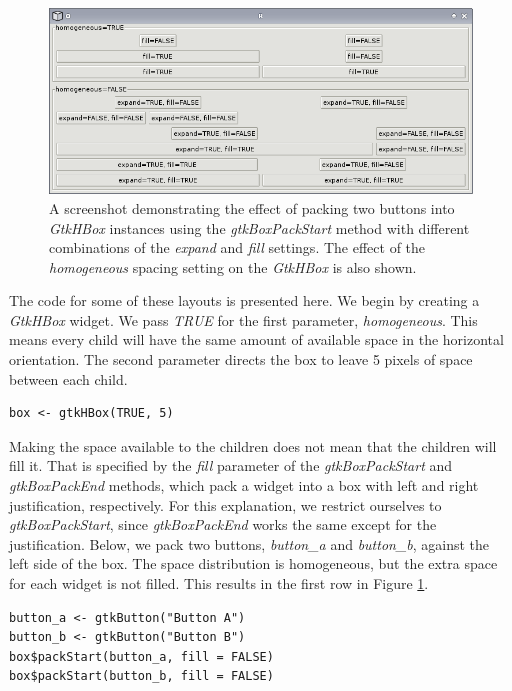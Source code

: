 \documentclass[article]{jss}
\begin{document}
\begin{figure}
\begin{center}
\includegraphics{packing.png}
\caption{\label{fig:packing}A screenshot demonstrating the effect of packing two
buttons into \emph{GtkHBox} instances using the \emph{gtkBoxPackStart} method 
with different combinations of the \emph{expand} and \emph{fill} settings. 
The effect of the \emph{homogeneous} spacing setting on the \emph{GtkHBox} is 
also shown.}
\end{center}
\end{figure}

The code for some of these layouts is presented here.
We begin by creating a \emph{GtkHBox} widget. We pass \emph{TRUE} for the
first parameter, \emph{homogeneous}. This means every child will have the
same amount of available space in the horizontal orientation. The second 
parameter directs the box to leave 5 pixels of space between each child. 
\begin{verbatim}
box <- gtkHBox(TRUE, 5)
\end{verbatim}
Making the space available to the children does not mean that the children 
will fill it. That is specified by the \emph{fill} parameter of the 
\emph{gtkBoxPackStart} and \emph{gtkBoxPackEnd} methods, which pack a widget 
into a box with left and right justification, respectively. For this explanation,
we restrict ourselves to \emph{gtkBoxPackStart}, since \emph{gtkBoxPackEnd}
works the same except for the justification. Below, we pack two buttons, 
\emph{button\_a} and \emph{button\_b}, against
the left side of the box. The space distribution is homogeneous, but the
extra space for each widget is not filled. This results in the first row in 
Figure \ref{fig:packing}.
\begin{verbatim}
button_a <- gtkButton("Button A")
button_b <- gtkButton("Button B")
box$packStart(button_a, fill = FALSE)
box$packStart(button_b, fill = FALSE)
\end{verbatim}
\end{document}

